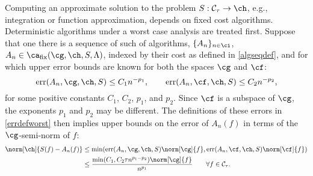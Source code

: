 \documentclass[final]{elsarticle}
\newcommand{\cc}{\mathcal{C}}
\DeclareMathOperator{\err}{err}
\theoremstyle{definition}
\theoremstyle{remark}
\DeclareMathOperator{\fix}{fix}
\begin{document}
Computing an approximate solution to the problem $S: \cc_{\tau} \to \ch$, e.g., integration or function approximation, depends on fixed cost algorithms. Deterministic algorithms under a worst case analysis are treated first.  Suppose that one there is a sequence of such of algorithms, $\{A_n\}_{n \in \ci}$, $A_n  \in \ca_{\fix}(\cg,\ch,S,\Lambda)$, indexed by their cost as defined in \eqref{algseqdef}, and for which upper error bounds are known for both the spaces $\cg$ and $\cf$:
\begin{equation}\label{algseqerrbd}
\err(A_n,\cg,\ch,S) \le C_{1} n^{-p_1}, \qquad \err(A_n,\cf,\ch,S) \le C_{2} n^{-p_2}, 
\end{equation}
for some positive constants $C_1$, $C_2$, $p_1$, and $p_2$.  Since $\cf$ is a subspace of $\cg$, the exponents $p_1$ and $p_2$ may be different.  The definitions of these errors in \eqref{errdefworst} then implies upper bounds on the error of $A_n(f)$ in terms of the $\cg$-semi-norm of $f$:
\begin{align} \nonumber
\norm[\ch]{S(f) -  A_n(f)} &\le \min(\err(A_n,\cg,\ch,S)\norm[\cg]{f},\err(A_n,\cf,\ch,S)\norm[\cf]{f}) \\
\label{Anerrbound}
&\le \frac{\min(C_1,C_2\tau n^{p_1-p_2})\norm[\cg]{f}}{n^{p_1}} \qquad \forall f \in \cc_{\tau}.
\end{align}
\end{document}
